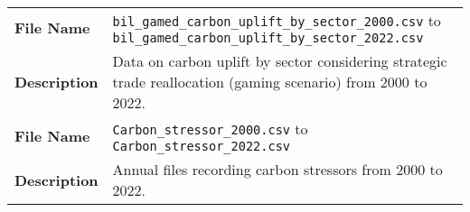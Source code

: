 \begin{appendices}
\begin{longtable}{|p{}|p{}|}
    \hline
    \textbf{File Name} & \texttt{bil\_gamed\_carbon\_uplift\_by\_sector\_2000.csv} to \texttt{bil\_gamed\_carbon\_uplift\_by\_sector\_2022.csv} \\
    \textbf{Description} & Data on carbon uplift by sector considering strategic trade reallocation (gaming scenario) from 2000 to 2022. \\
    \hline
    \textbf{File Name} & \texttt{Carbon\_stressor\_2000.csv} to \texttt{Carbon\_stressor\_2022.csv} \\
    \textbf{Description} & Annual files recording carbon stressors from 2000 to 2022. \\
    \hline
\end{longtable}
\end{appendices}
